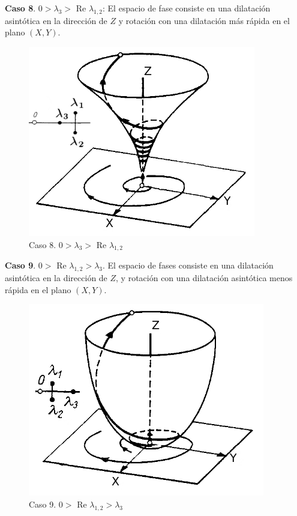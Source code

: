 \documentclass[a4paper,10pt]{article}
\numberwithin{equation}{section}
\begin{document}
\textbf{Caso 8}. $0 > \lambda_3 > $ Re $\lambda_{1,2}$: El espacio de fase consiste en una dilatación asintótica en 
la dirección de $Z$ y rotación con una dilatación más rápida en el plano $(X,Y)$.

\begin{figure}[h!]
 \centering
\includegraphics[scale=0.35]{problema3fig9}
\caption{Caso 8. $0 > \lambda_3 > $ Re $\lambda_{1,2}$}
\label{fig:problema3fig9}
\end{figure}
\vspace{.3cm}

\textbf{Caso 9}. $0 > $ Re $\lambda_{1,2} > \lambda_3$. El espacio de fases consiste en una dilatación asintótica
en la dirección de $Z$, y rotación con una dilatación asintótica menos rápida en el plano $(X,Y)$.

\begin{figure}[H]
 \centering
\includegraphics[scale=0.35]{problema3fig10}
\caption{Caso 9. $0 > $ Re $\lambda_{1,2} > \lambda_3$}
\label{fig:problema3fig10}
\end{figure}
\vspace{.3cm}
\end{document}
